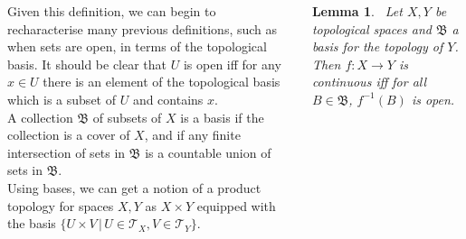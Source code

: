 \documentclass{tikzposter} %
\newtheorem{lemma}[theorem]{Lemma}
\begin{document}
\begin{columns}
{  Given this definition, we can begin to recharacterise many previous definitions, such as when sets are open, in terms of the topological basis. It should be clear that $U$ is open iff for any $x \in U$ there is an element of the topological basis which is a subset of $U$ and contains $x$. \\

  A collection $\mathfrak{B}$ of subsets of $X$ is a basis if the collection is a cover of $X$, and if any finite intersection of sets in $\mathfrak{B}$ is a countable union of sets in $\mathfrak{B}$. \\

  Using bases, we can get a notion of a product topology for spaces $X, Y$ as $X \times Y$ equipped with the basis $\{U \times V \,|\, U \in \mathcal{T}_{X}, V \in \mathcal{T}_{Y}\}$. \\

  \begin{lemma}
  \ Let $X, Y$ be topological spaces and $\mathfrak{B}$ a basis for the topology of $Y$. Then $f : X \to Y$ is continuous iff for all $B \in \mathfrak{B}$, $f^{-1}(B)$ is open.
  \end{lemma}
  \hphantom{}
}

\end{columns}
\end{document}
